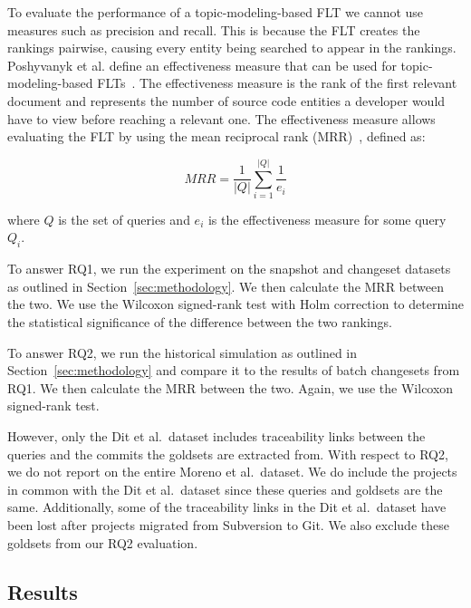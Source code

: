 To evaluate the performance of a topic-modeling-based FLT we cannot use
measures such as precision and recall. This is because the FLT creates
the rankings pairwise, causing every entity being searched to appear in the rankings.
Poshyvanyk et al. define an effectiveness measure that can be used for topic-modeling-based FLTs~\cite{Poshyvanyk-etal:2007}.
The effectiveness measure is the rank of the first relevant document
and represents the number of source code entities a developer would have to view before reaching a relevant one.
The effectiveness measure allows evaluating the FLT by using
the mean reciprocal rank (MRR)~\cite{Voorhees:1999}, defined as:

\begin{equation}
    MRR = \frac{1}{|Q|} \sum_{i=1}^{|Q|} \frac{1}{e_i}
\end{equation}

where $Q$ is the set of queries
and $e_i$ is the effectiveness measure for some query $Q_i$.

To answer RQ1, we run the experiment on the snapshot and changeset
datasets as outlined in Section~\ref{sec:methodology}.
We then calculate the MRR between the two.
We use the Wilcoxon signed-rank test with Holm correction to determine
the statistical significance of the difference between the two rankings.

To answer RQ2, we run the historical simulation as outlined in Section~\ref{sec:methodology}
and compare it to the results of batch changesets from RQ1.
We then calculate the MRR between the two.
Again, we use the Wilcoxon signed-rank test.

However, only the Dit et al.\ dataset includes traceability links between
the queries and the commits the goldsets are extracted from.
With respect to RQ2, we do not report on the entire Moreno et al.\ dataset.
We do include the projects in common with the Dit et al.\ dataset
since these queries and goldsets are the same.
Additionally, some of the traceability links in the Dit et al.\ dataset
have been lost after projects migrated from Subversion to Git.
We also exclude these goldsets from our RQ2 evaluation.



\subsection{Results}




